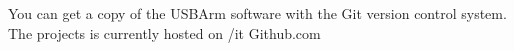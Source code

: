 \begin{obtainingsoftware}

You can get a copy of the USBArm software with the Git version control system. The projects is currently hosted on {/it Github.com}

\end{obtainingsoftware}
